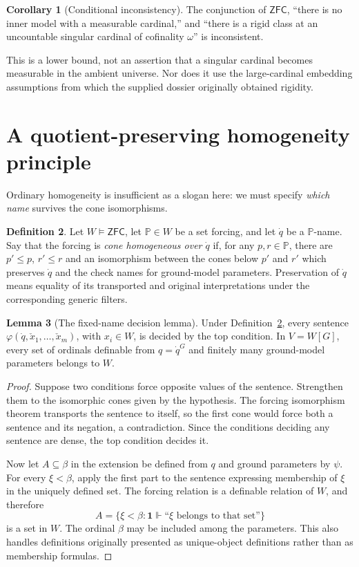 \documentclass[11pt,letterpaper]{article}
\theoremstyle{definition}
\newtheorem{definition}{Definition}[section]
\newtheorem{lemma}[definition]{Lemma}
\newtheorem{corollary}[definition]{Corollary}
\numberwithin{equation}{section}
\newcommand{\ZFC}{\mathsf{ZFC}}
\newcommand{\PP}{\mathbb P}
\newcommand{\one}{\mathbf 1}
\begin{document}
\begin{corollary}[Conditional inconsistency]\label{cor:no-inner}
The conjunction of $\ZFC$, ``there is no inner model with a measurable
cardinal,'' and ``there is a rigid class at an uncountable singular cardinal
of cofinality $\omega$'' is inconsistent.
\end{corollary}

This is a lower bound, not an assertion that a singular cardinal becomes
measurable in the ambient universe. Nor does it use the large-cardinal
embedding assumptions from which the supplied dossier originally obtained
rigidity.

\section{A quotient-preserving homogeneity principle}\label{sec:transfer}

Ordinary homogeneity is insufficient as a slogan here: we must specify
\emph{which name} survives the cone isomorphisms.

\begin{definition}\label{def:qh}
Let $W\models\ZFC$, let $\PP\in W$ be a set forcing, and let $\dot q$
be a $\PP$-name. Say that the forcing is \emph{cone homogeneous over
$\dot q$} if, for any $p,r\in\PP$, there are $p'\le p$, $r'\le r$ and
an isomorphism between the cones below $p'$ and $r'$ which preserves
$\dot q$ and the check names for ground-model parameters.
Preservation of $\dot q$ means equality of its transported and original
interpretations under the corresponding generic filters.
\end{definition}

\begin{lemma}[The fixed-name decision lemma]\label{lem:decision}
Under Definition~\ref{def:qh}, every sentence
$\varphi(\dot q,\check x_1,\ldots,\check x_m)$, with $x_i\in W$, is
decided by the top condition. In $V=W[G]$, every set of ordinals definable
from $q=\dot q^G$ and finitely many ground-model parameters belongs to $W$.
\end{lemma}
\begin{proof}
Suppose two conditions force opposite values of the sentence. Strengthen
them to the isomorphic cones given by the hypothesis. The forcing
isomorphism theorem transports the sentence to itself, so the first cone
would force both a sentence and its negation, a contradiction. Since the
conditions deciding any sentence are dense, the top condition decides it.

Now let $A\subseteq\beta$ in the extension be defined from $q$ and ground
parameters by $\psi$. For every $\xi<\beta$, apply the first part to the
sentence expressing membership of $\xi$ in the uniquely defined set.
The forcing relation is a definable relation of $W$, and therefore
\[
 A=\{\xi<\beta: \one\Vdash\text{``$\xi$ belongs to that set''}\}
\]
is a set in $W$. The ordinal $\beta$ may be included among the parameters.
This also handles definitions originally presented as unique-object
definitions rather than as membership formulas.
\end{proof}
\end{document}
